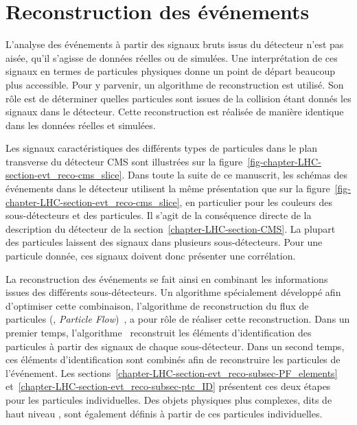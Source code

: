 \section{Reconstruction des événements}\label{chapter-LHC-section-evt_reco}
L'analyse des événements à partir des signaux bruts issus du détecteur n'est pas aisée, qu'il s'agisse de données réelles ou de simulées.
Une interprétation de ces signaux en termes de particules physiques donne un point de départ beaucoup plus accessible.
Pour y parvenir, un algorithme de reconstruction est utilisé.
Son rôle est de déterminer quelles particules sont issues de la collision étant donnés les signaux dans le détecteur.
Cette reconstruction est réalisée de manière identique dans les données réelles et simulées.
\par
Les signaux caractéristiques des différents types de particules dans le plan transverse du détecteur CMS sont illustrées sur la figure~\ref{fig-chapter-LHC-section-evt_reco-cms_slice}.
Dans toute la suite de ce manuscrit, les schémas des événements dans le détecteur utilisent la même présentation que sur la figure~\ref{fig-chapter-LHC-section-evt_reco-cms_slice}, en particulier pour les couleurs des sous-détecteurs et des particules.
Il s'agit de la conséquence directe de la description du détecteur de la section~\ref{chapter-LHC-section-CMS}.
La plupart des particules laissent des signaux dans plusieurs sous-détecteurs.
Pour une particule donnée, ces signaux doivent donc présenter une corrélation.
\par La reconstruction des événements se fait ainsi en combinant les informations issues des différents sous-détecteurs.
Un algorithme spécialement développé afin d'optimiser cette combinaison, l'algorithme de reconstruction du flux de particules (\PF, \emph{Particle Flow})~\cite{particle-flow,Dordevic_particle_flow}, a pour rôle de réaliser cette reconstruction.
Dans un premier temps, l'algorithme \PF\ reconstruit les éléments d'identification des particules à partir des signaux de chaque sous-détecteur.
Dans un second temps, ces éléments d'identification sont combinés afin de reconstruire les particules de l'événement.
Les sections~\ref{chapter-LHC-section-evt_reco-subsec-PF_elements} et~\ref{chapter-LHC-section-evt_reco-subsec-ptc_ID} présentent ces deux étapes pour les particules individuelles.
Des objets physiques plus complexes, dits de \og haut niveau \fg, sont également définis à partir de ces particules individuelles.
